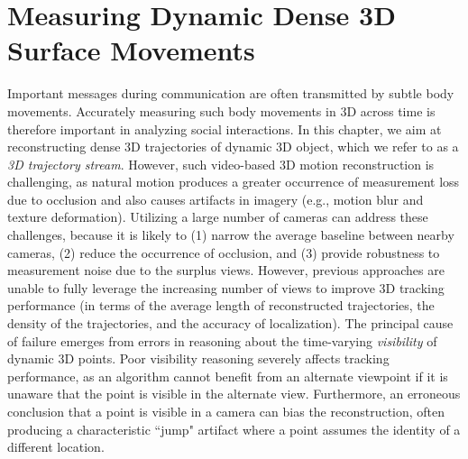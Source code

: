 
\chapter{Measuring Dynamic Dense 3D Surface Movements}
\label{chapter:trajectory}

Important messages during communication are often transmitted by subtle body movements. Accurately measuring such body movements in 3D across time is therefore important in analyzing social interactions. In this chapter, we aim at reconstructing dense 3D trajectories of dynamic 3D object, which we refer to as a \emph{3D trajectory stream}. However, such video-based 3D motion reconstruction is challenging, as natural motion produces a greater occurrence of measurement loss due to occlusion and also causes artifacts in imagery (e.g., motion blur and texture deformation). Utilizing a large number of cameras can address these challenges, because it is likely to (1) narrow the average baseline between nearby cameras, (2) reduce the occurrence of occlusion, and (3) provide robustness to measurement noise due to the surplus views. However, previous approaches are unable to fully leverage the increasing number of views to improve 3D tracking performance (in terms of the average length of reconstructed trajectories, the density of the trajectories, and the accuracy of localization). The principal cause of failure emerges from errors in reasoning about the time-varying \emph{visibility} of dynamic 3D points. Poor visibility reasoning severely affects tracking performance, as an algorithm cannot benefit from an alternate viewpoint if it is unaware that the point is visible in the alternate view. Furthermore, an erroneous conclusion that a point is visible in a camera can bias the reconstruction, often producing a characteristic ``jump" artifact where a point assumes the identity of a different location.





